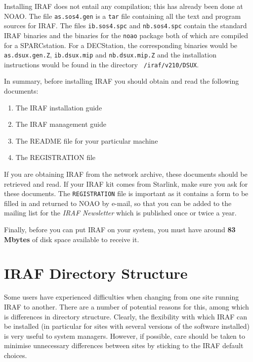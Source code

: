 Installing IRAF does not entail any compilation; this has already been
done at NOAO. The file {\tt as.sos4.gen} is a {\tt tar} file containing all
the text and program sources for IRAF. The files {\tt ib.sos4.spc} and
{\tt nb.sos4.spc} contain the standard IRAF binaries and the binaries
for the {\tt noao} package both of which are compiled for a
SPARCstation.  For a DECStation, the corresponding binaries would be
{\tt as.dsux.gen.Z}, {\tt ib.dsux.mip} and {\tt nb.dsux.mip.Z} and the
installation instructions would be found in the directory {\tt
/iraf/v210/DSUX}.

In summary, before installing IRAF you should obtain and read the
following documents:

\begin{enumerate}
\item{The IRAF installation guide}

\item{The IRAF management guide}

\item{The README file for your particular machine}

\item{The REGISTRATION file}

\end{enumerate}

If you are obtaining IRAF from the network archive, these documents
should be retrieved and read.  If your IRAF kit comes from Starlink,
make sure you ask for these documents. The
{\tt REGISTRATION} file is important as it
contains a form to be filled in and returned to NOAO by e-mail, so that
you can be added to the mailing list for the {\it IRAF Newsletter}\/ which is
published once or twice a year.

Finally, before you can put IRAF on your system, you must have around
{\bf 83\,Mbytes} of disk space available to receive it.

\section{IRAF Directory Structure}
 
Some users have experienced difficulties when changing from one site running 
IRAF to another. There are a number of potential reasons for this, among which
is differences in directory structure. Clearly, the flexibility with which
IRAF can be installed (in particular for sites with several versions of the
software installed) is very useful to system managers. However, if possible,
care should be taken to minimise unnecessary differences between sites by
sticking to the IRAF default choices.
 
